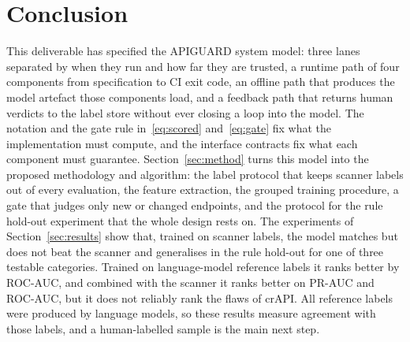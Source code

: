 \documentclass[conference]{IEEEtran}
\begin{document}
\section{Conclusion}
This deliverable has specified the APIGUARD system model: three lanes separated by when they
run and how far they are trusted, a runtime path of four components from specification to CI
exit code, an offline path that produces the model artefact those components load, and a
feedback path that returns human verdicts to the label store without ever closing a loop into
the model. The notation and the gate rule in~\eqref{eq:scored} and~\eqref{eq:gate} fix what
the implementation must compute, and the interface contracts fix what each component must
guarantee. Section~\ref{sec:method} turns this model into the proposed methodology and algorithm: the label
protocol that keeps scanner labels out of every evaluation, the feature extraction, the grouped
training procedure, a gate that judges only new or changed endpoints, and the protocol for the
rule hold-out experiment that the whole design rests on. The experiments of Section~\ref{sec:results} show that, trained on scanner labels, the model matches but does not beat the scanner and generalises in the rule hold-out for one of three testable categories. Trained on language-model reference labels it ranks better by ROC-AUC, and combined with the scanner it ranks better on PR-AUC and ROC-AUC, but it does not reliably rank the flaws of crAPI. All reference labels were produced by language models, so these results measure agreement with those labels, and a human-labelled sample is the main next step.

% 
% 
\end{document}
